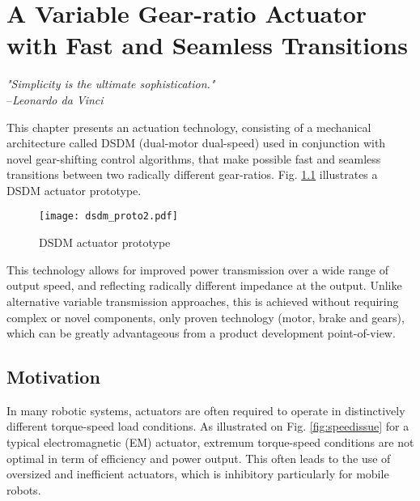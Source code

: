 \chapter{A Variable Gear-ratio Actuator with Fast and Seamless Transitions}
\label{sec:MultipleSpeedActuationTechnology}

\begin{flushright}
\textit{"Simplicity is the ultimate sophistication."} \\ --\emph{Leonardo da Vinci}
\end{flushright}

This chapter presents an actuation technology, consisting of a mechanical architecture called DSDM (dual-motor dual-speed) used in conjunction with novel gear-shifting control algorithms, that make possible fast and seamless transitions between two radically different gear-ratios. Fig. \ref{fig:dsdm_proto} illustrates a DSDM actuator prototype. 

\begin{figure}[H]
	\centering
		\texttt{[image: dsdm\_proto2.pdf]}
	\caption{DSDM actuator prototype}
	\label{fig:dsdm_proto}
\end{figure}

This technology allows for improved power transmission over a wide range of output speed, and reflecting radically different impedance at the output. Unlike alternative variable transmission approaches, this is achieved without requiring complex or novel components, only proven technology (motor, brake and gears), which can be greatly advantageous from a product development point-of-view. 

\section{Motivation}
\label{sec:mot}

In many robotic systems, actuators are often required to operate in distinctively different torque-speed load conditions. 
%
As illustrated on Fig. \ref{fig:speedissue} for a typical electromagnetic (EM) actuator, extremum torque-speed conditions are not optimal in term of efficiency and power output. This often leads to the use of oversized and inefficient actuators, which is inhibitory particularly for mobile robots.

